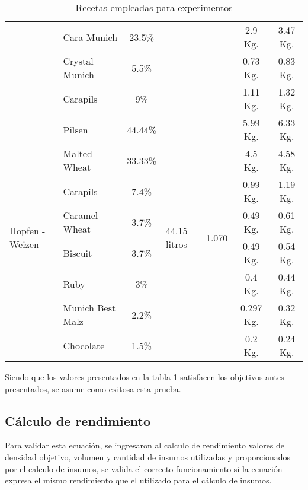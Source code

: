 \begin{table}[h]
\begin{tabularx}{\textwidth}{|X|X|X|X|X|X|X|}
         & Cara Munich & \multicolumn{1}{c|}{23.5\%} & & &\multicolumn{1}{c|}{2.9 Kg.} &\multicolumn{1}{c|}{3.47 Kg.} \\
        & Crystal Munich & \multicolumn{1}{c|}{5.5\%} & & &\multicolumn{1}{c|}{0.73 Kg.} &\multicolumn{1}{c|}{0.83 Kg.} \\
        & Carapils & \multicolumn{1}{c|}{9\%} & & &\multicolumn{1}{c|}{1.11 Kg.} &\multicolumn{1}{c|}{1.32 Kg.} \\
        \hline
        \multirow{8}{2cm}{Hopfen - Weizen} & Pilsen &\multicolumn{1}{c|}{44.44\%}  &\multirow{8}{2cm}{44.15 litros}  &\multirow{8}{2cm}{1.070} & \multicolumn{1}{c|}{5.99 Kg.} & \multicolumn{1}{c|}{6.33 Kg.}\\
         & Malted Wheat & \multicolumn{1}{c|}{33.33\%} & & &\multicolumn{1}{c|}{4.5 Kg.} &\multicolumn{1}{c|}{4.58 Kg.} \\
         & Carapils & \multicolumn{1}{c|}{7.4\%} & & &\multicolumn{1}{c|}{0.99 Kg.} &\multicolumn{1}{c|}{1.19 Kg.} \\
         & Caramel Wheat & \multicolumn{1}{c|}{3.7\%} & & &\multicolumn{1}{c|}{0.49 Kg.} &\multicolumn{1}{c|}{0.61 Kg.} \\
         & Biscuit & \multicolumn{1}{c|}{3.7\%} & & &\multicolumn{1}{c|}{0.49 Kg.} &\multicolumn{1}{c|}{0.54 Kg.} \\
         & Ruby & \multicolumn{1}{c|}{3\%} & & &\multicolumn{1}{c|}{0.4 Kg.} &\multicolumn{1}{c|}{0.44 Kg.} \\
         & Munich Best Malz & \multicolumn{1}{c|}{2.2\%} & & &\multicolumn{1}{c|}{0.297 Kg.} &\multicolumn{1}{c|}{0.32 Kg.} \\
         & Chocolate & \multicolumn{1}{c|}{1.5\%} & & &\multicolumn{1}{c|}{0.2 Kg.} &\multicolumn{1}{c|}{0.24 Kg.} \\
        \hline
    \end{tabularx}
    \caption{Recetas empleadas para experimentos}
    \label{tab:TablaRecetaExperimentos}
\end{table}
\par Siendo que los valores presentados en la tabla \ref{tab:TablaRecetaExperimentos} satisfacen los objetivos antes presentados, se asume como exitosa esta prueba.

\subsection{Cálculo de rendimiento}
Para validar esta ecuación, se ingresaron al calculo de rendimiento valores de densidad objetivo, volumen y cantidad de insumos utilizadas y proporcionados por el calculo de insumos, se valida el correcto funcionamiento si la ecuación expresa el mismo rendimiento que el utilizado para el cálculo de insumos.

